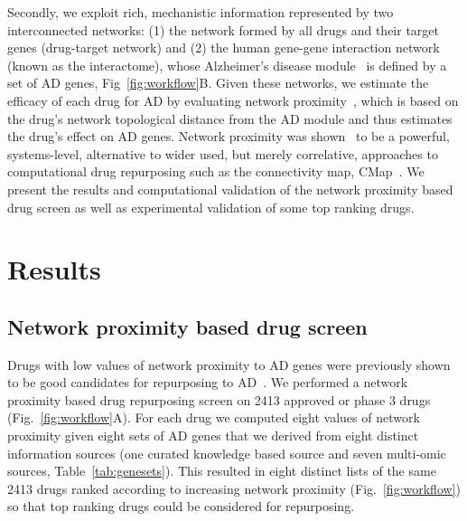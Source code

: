 \documentclass[letterpaper]{article}
\begin{document}
Secondly, we exploit rich, mechanistic information represented by two
interconnected networks: (1) the network formed by all drugs and their target
genes (drug-target network) and (2) the human gene-gene interaction network
(known as the interactome), whose Alzheimer's disease
module~\citep{Barabasi2011} is defined by a set of AD genes,
Fig~\ref{fig:workflow}B.  Given these networks, we estimate the efficacy of
each drug for AD by evaluating network proximity~\citep{Guney2016}, which is
based on the drug's network topological distance from the AD module and thus
estimates the drug's effect on AD genes.  Network proximity was
shown~\citep{Cheng2018} to be a powerful, systems-level, alternative to wider
used, but merely correlative, approaches to computational drug repurposing
such as the connectivity map, CMap~\citep{Lamb2006}.  We present the results
and computational validation of the network proximity based drug screen as well as
experimental validation of some top ranking drugs.

\section{Results}

\subsection{Network proximity based drug screen}

Drugs with low values of network proximity to AD genes were previously shown
to be good candidates for repurposing to AD~\citep{Cheng2018}.  We performed a
network proximity based drug repurposing screen on 2413 approved or phase 3
drugs (Fig.~\ref{fig:workflow}A).  For each drug we computed eight values of
network proximity given eight sets of AD genes that we derived from eight
distinct information sources (one curated knowledge based source and seven
multi-omic sources, Table~\ref{tab:genesets}).  This resulted in eight
distinct lists of the same 2413 drugs ranked according to increasing network
proximity (Fig.~\ref{fig:workflow}) so that top ranking drugs could be
considered for repurposing.
\end{document}
